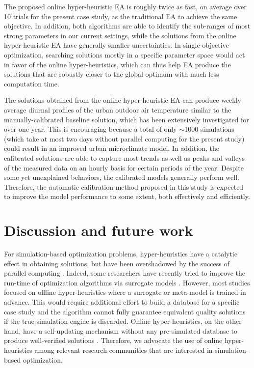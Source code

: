 The proposed online hyper-heuristic EA is roughly twice as fast, on average over 10 trials for the present case study, as the traditional EA to achieve the same objective. In addition, both algorithms are able to identify the sub-ranges of most strong parameters in our current settings, while the solutions from the online hyper-heuristic EA have generally smaller uncertainties. In single-objective optimization, searching solutions mostly in a specific parameter space would act in favor of the online hyper-heuristics, which can thus help EA produce the solutions that are robustly closer to the global optimum with much less computation time.

The solutions obtained from the online hyper-heuristic EA can produce weekly-average diurnal profiles of the urban outdoor air temperature similar to the manually-calibrated baseline solution, which has been extensively investigated for over one year. This is encouraging because a total of only $\sim$1000 simulations (which take at most two days without parallel computing for the present study) could result in an improved urban microclimate model. In addition, the calibrated solutions are able to capture most trends as well as peaks and valleys of the measured data on an hourly basis for certain periods of the year. Despite some yet unexplained behaviors, the calibrated models generally perform well. Therefore, the automatic calibration method proposed in this study is expected to improve the model performance to some extent, both effectively and efficiently.



\section{Discussion and future work}

For simulation-based optimization problems, hyper-heuristics have a catalytic effect in obtaining solutions, but have been overshadowed by the success of parallel computing \cite{zhang2009parallel}. Indeed, some researchers have recently tried to improve the run-time of optimization algorithms via surrogate models \cite{eisenhower2012methodology,boithias2012genetic,vcongradac2012recognition}. However, most studies focused on offline hyper-heuristics where a surrogate or meta-model is trained in advance. This would require additional effort to build a database for a specific case study and the algorithm cannot fully guarantee equivalent quality solutions if the true simulation engine is discarded. Online hyper-heuristics, on the other hand, have a self-updating mechanism without any pre-simulated database to produce well-verified solutions \cite{brownlee2015constrained,xu2016improving}. Therefore, we advocate the use of online hyper-heuristics among relevant research communities that are interested in simulation-based optimization.

